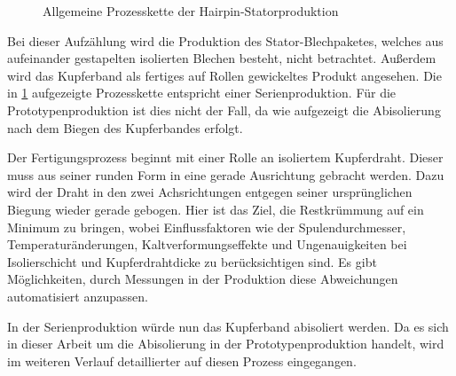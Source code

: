 \begin{figure}[htbp]
\caption[Prozesskette der Hairpin-Statorproduktion]{Allgemeine Prozesskette der Hairpin-Statorproduktion}
\label{fig:Produktionsablauf}
\end{figure}

Bei dieser Aufzählung wird die Produktion des Stator-Blechpaketes, welches aus aufeinander gestapelten isolierten Blechen
besteht, nicht betrachtet. Außerdem wird das Kupferband als fertiges auf Rollen gewickeltes Produkt angesehen. Die in \cref{fig:Produktionsablauf} aufgezeigte
Prozesskette entspricht einer Serienproduktion. Für die
Prototypenproduktion ist dies nicht der Fall, da wie aufgezeigt die Abisolierung nach dem Biegen des Kupferbandes erfolgt.

Der Fertigungsprozess beginnt mit einer Rolle an isoliertem Kupferdraht. Dieser muss aus seiner runden Form in eine gerade
Ausrichtung gebracht werden. Dazu wird der Draht in den zwei Achsrichtungen entgegen seiner ursprünglichen Biegung wieder gerade gebogen.
Hier ist das Ziel, die Restkrümmung auf ein Minimum zu bringen, wobei Einflussfaktoren wie der Spulendurchmesser, Temperaturänderungen,
Kaltverformungseffekte und Ungenauigkeiten bei Isolierschicht und Kupferdrahtdicke zu berücksichtigen sind. Es gibt Möglichkeiten, durch Messungen
in der Produktion diese Abweichungen automatisiert anzupassen.

In der Serienproduktion würde nun das Kupferband abisoliert werden. Da es sich in dieser Arbeit um die Abisolierung in der Prototypenproduktion
handelt, wird im weiteren Verlauf detaillierter auf diesen Prozess eingegangen.

